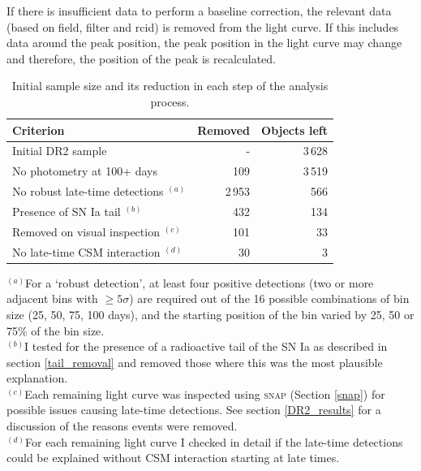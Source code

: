 \documentclass[a4paper,oneside,12pt, class=Latex/Classes/PhDthesisPSnPDF, crop=false]{standalone}
\begin{document}
If there is insufficient data to perform a baseline correction, the relevant data (based on field, filter and rcid) is removed from the light curve. If this includes data around the peak position, the peak position in the light curve may change and therefore, the position of the peak is recalculated.


\begin{table}
 \centering
 \caption{Initial sample size and its reduction in each step of the analysis process.}
 \begin{tabular}{lrr}
  \hline
  Criterion & Removed & Objects left\\
  \hline
  Initial DR2 sample & - & 3\,628\\
  No photometry at 100+ days & 109 & 3\,519\\
   No robust late-time detections $^{(a)}$ & 2\,953 & 566\\
  Presence of SN Ia tail $^{(b)}$ & 432 & 134\\
  Removed on visual inspection $^{(c)}$ & 101 & 33\\
  No late-time CSM interaction $^{(d)}$ & 30 & 3\\
  \hline
 \end{tabular}
 \label{obj_breakdown}
\begin{flushleft}
$^{(a)}$For a `robust detection', at least four positive detections (two or more adjacent bins with $\ge5\sigma$) are required out of the 16 possible combinations of bin size (25, 50, 75, 100 days), and the starting position of the bin varied by 25, 50 or 75\% of the bin size. \\
$^{(b)}$I tested for the presence of a radioactive tail of the SN Ia as described in section \ref{tail_removal} and removed those where this was the most plausible explanation. \\
$^{(c)}$Each remaining light curve was inspected using \textsc{snap} (Section \ref{snap}) for possible issues causing late-time detections. See section \ref{DR2_results} for a discussion of the reasons events were removed.\\
$^{(d)}$For each remaining light curve I checked in detail if the late-time detections could be explained without CSM interaction starting at late times.
\end{flushleft}
\end{table}
\end{document}
